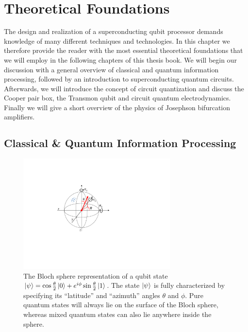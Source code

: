 \chapter{Theoretical Foundations} \label{chapter:theory}

The design and realization of a superconducting qubit processor demands knowledge of many different techniques and technologies. In this chapter we therefore provide the reader with the most essential theoretical foundations that we will employ in the following chapters of this thesis book. We will begin our discussion with a general overview of classical and quantum information processing, followed by an introduction to superconducting quantum circuits. Afterwards, we will introduce the concept of circuit quantization and discuss the Cooper pair box, the Transmon qubit and circuit quantum electrodynamics. Finally we will give a short overview of the physics of Josephson bifurcation amplifiers.

\section{Classical \& Quantum Information Processing}

\begin{figure}
	\includegraphics[width=8cm]{"./material/figures/introduction/bloch_sphere"}
	\caption{The Bloch sphere representation of a qubit state $\left| \psi \right> = \cos{\frac{\theta}{2}}\left| 0 \right>+e^{i\phi}\sin{\frac{\theta}{2}}\left| 1 \right>$. The state $\left| \psi \right>$ is fully characterized by specifying its ``latitude'' and ``azimuth'' angles $\theta$ and $\phi$. Pure quantum states will always lie on the surface of the Bloch sphere, whereas mixed quantum states can also lie anywhere inside the sphere.}
	\label{fig:BlochSphere}
\end{figure}

